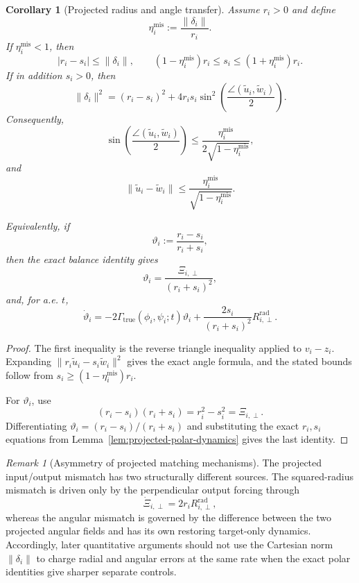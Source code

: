 \documentclass{article} %
\theoremstyle{plain}
\newtheorem{corollary}[theorem]{Corollary}
\theoremstyle{definition}
\theoremstyle{remark}
\newtheorem{remark}[theorem]{Remark}
\begin{document}
\begin{corollary}[Projected radius and angle transfer]
\label{cor:projected-radius-transfer}
Assume $r_i>0$ and define
\[
\eta_i^{\mathrm{mis}}
:=
\frac{\|\delta_i\|}{r_i}.
\]
If $\eta_i^{\mathrm{mis}}<1$, then
\[
\boxed{
|r_i-s_i|
\le
\|\delta_i\|,
\qquad
(1-\eta_i^{\mathrm{mis}})r_i
\le
s_i
\le
(1+\eta_i^{\mathrm{mis}})r_i.
}
\]
If in addition $s_i>0$, then
\[
\boxed{
\|\delta_i\|^2
=
(r_i-s_i)^2
+
4r_is_i
\sin^2\!\left(
\frac{\angle(\widetilde u_i,\widetilde w_i)}2
\right).
}
\]
Consequently,
\[
\boxed{
\sin\!\left(
\frac{\angle(\widetilde u_i,\widetilde w_i)}2
\right)
\le
\frac{\eta_i^{\mathrm{mis}}}{2\sqrt{1-\eta_i^{\mathrm{mis}}}},
}
\]
and
\[
\boxed{
\|\widetilde u_i-\widetilde w_i\|
\le
\frac{\eta_i^{\mathrm{mis}}}{\sqrt{1-\eta_i^{\mathrm{mis}}}}.
}
\]

Equivalently, if
\[
\vartheta_i
:=
\frac{r_i-s_i}{r_i+s_i},
\]
then the exact balance identity gives
\[
\boxed{
\vartheta_i
=
\frac{\Xi_{i,\perp}}{(r_i+s_i)^2},
}
\]
and, for a.e. $t$,
\[
\boxed{
\dot\vartheta_i
=
-2\Gamma_{\mathrm{true}}(\phi_i,\psi_i;t)\vartheta_i
+
\frac{2s_i}{(r_i+s_i)^2}
R_{i,\perp}^{\mathrm{rad}}.
}
\]
\end{corollary}

\begin{proof}
The first inequality is the reverse triangle inequality applied to
$v_i-z_i$.  Expanding
$\|r_i\widetilde u_i-s_i\widetilde w_i\|^2$ gives the exact angle formula,
and the stated bounds follow from
$s_i\ge(1-\eta_i^{\mathrm{mis}})r_i$.

For $\vartheta_i$, use
\[
(r_i-s_i)(r_i+s_i)
=
r_i^2-s_i^2
=
\Xi_{i,\perp}.
\]
Differentiating $\vartheta_i=(r_i-s_i)/(r_i+s_i)$ and substituting the exact
$r_i,s_i$ equations from Lemma~\ref{lem:projected-polar-dynamics} gives the
last identity.
\end{proof}

\begin{remark}[Asymmetry of projected matching mechanisms]
\label{rem:projected-dynamics-asymmetry}
The projected input/output mismatch has two structurally different sources.
The squared-radius mismatch is driven only by the perpendicular output
forcing through
\[
\dot\Xi_{i,\perp}
=
2r_iR_{i,\perp}^{\mathrm{rad}},
\]
whereas the angular mismatch is governed by the difference between the two
projected angular fields and has its own restoring target-only dynamics.
Accordingly, later quantitative arguments should not use the Cartesian norm
$\|\delta_i\|$ to charge radial and angular errors at the same rate when the
exact polar identities give sharper separate controls.
\end{remark}
\end{document}
